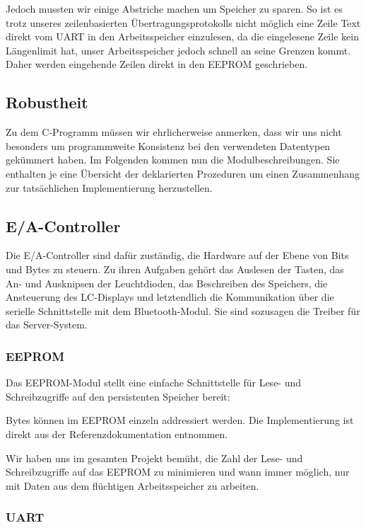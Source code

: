 \documentclass[ngerman]{article}
\begin{document}
Jedoch mussten wir einige Abstriche machen um Speicher zu sparen. So ist
es trotz unseres zeilenbasierten Übertragungsprotokolls nicht möglich eine
Zeile Text direkt vom UART in den Arbeitsspeicher einzulesen, da die
eingelesene Zeile kein Längenlimit hat, unser Arbeitsspeicher jedoch schnell
an seine Grenzen kommt. Daher werden eingehende Zeilen direkt in den EEPROM
geschrieben.

\subsection{Robustheit}

Zu dem C-Programm müssen wir ehrlicherweise anmerken, dass wir uns nicht
besonders um programmweite Konsistenz bei den verwendeten Datentypen
ge\-kümmert haben. Im Folgenden kommen nun die Modulbeschreibungen. Sie
enthalten je eine Übersicht der deklarierten Prozeduren um einen Zusammenhang
zur tatsächlichen Implementierung herzustellen.


\subsection{E/A-Controller}

Die E/A-Controller sind dafür zuständig, die Hardware auf der Ebene von Bits
und Bytes zu steuern. Zu ihren Aufgaben gehört das Auslesen der Tasten, das An-
und Ausknipsen der Leuchtdioden,  das Beschreiben des Speichers, die
Ansteuerung des LC-Displays und letztendlich die Kommunikation über die
serielle Schnittstelle mit dem Bluetooth-Modul. Sie sind sozusagen die Treiber
für das Server-System.

\subsubsection{EEPROM}

Das EEPROM-Modul stellt eine einfache Schnittstelle für Lese- und
Schreibzugriffe auf den persistenten Speicher bereit:
 


Bytes können im EEPROM einzeln addressiert werden. Die Implementierung ist
direkt aus der Referenzdokumentation entnommen.

Wir haben uns im gesamten Projekt bemüht, die Zahl der Lese- und
Schreibzugriffe auf das EEPROM zu minimieren und wann immer möglich, nur mit
Daten aus dem flüchtigen Arbeitsspeicher zu arbeiten.

\subsubsection{UART}
\end{document}
